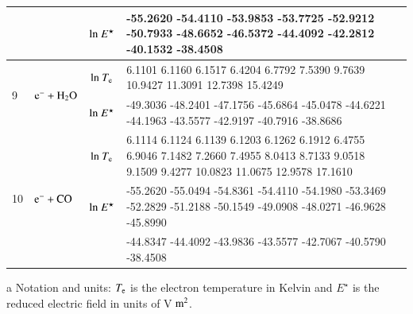 \begin{table}[!htbp]
\begin{threeparttable}
\begin{tabular*}{1.1\textwidth}{l@{\extracolsep{\fill}}lcll}
  &  & ${\rm ln}~E^\star$     & \tiny       -55.2620  -54.4110  -53.9853  -53.7725  -52.9212  -50.7933  -48.6652  -46.5372  -44.4092  -42.2812  -40.1532  -38.4508
  \\  
  
    \midrule  
  \multirow{2}{*}{9} &  \multirow{2}{*}{ $\rm e^- + H_2 O$   } & ${\rm ln}~T_{\rm e}$  & \tiny         6.1101    6.1160    6.1517    6.4204    6.7792    7.5390    9.7639   10.9427   11.3091   12.7398   15.4249
  \\
  
  &  & ${\rm ln}~E^\star$     & \tiny      -49.3036  -48.2401  -47.1756  -45.6864  -45.0478  -44.6221  -44.1963  -43.5577  -42.9197  -40.7916  -38.8686
  \\  
  
  
    \midrule  
  \multirow{3}{*}{10} &  \multirow{3}{*}{ $\rm e^- + CO$   } & ${\rm ln}~T_{\rm e}$  & \tiny     6.1114    6.1124    6.1139    6.1203    6.1262    6.1912    6.4755    6.9046    7.1482    7.2660    7.4955    8.0413    8.7133    9.0518    9.1509    9.4277   10.0823   11.0675   12.9578   17.1610

  \\
  
  &  & ${\rm ln}~E^\star$     & \tiny  -55.2620  -55.0494  -54.8361  -54.4110  -54.1980  -53.3469  -52.2829  -51.2188  -50.1549  -49.0908  -48.0271  -46.9628  -45.8990  

  \\  
  
&  &   & \tiny -44.8347  -44.4092  -43.9836  -43.5577  -42.7067  -40.5790  -38.4508 \\
                       
    \bottomrule
    \end{tabular*}
\begin{tablenotes}
\item[{a}] Notation and units: $T_{\rm e}$ is the electron temperature in Kelvin and $E^\star$ is the reduced electric field in units of V$\rm ~m^2$.
\end{tablenotes}
   \end{threeparttable}
\end{table}
